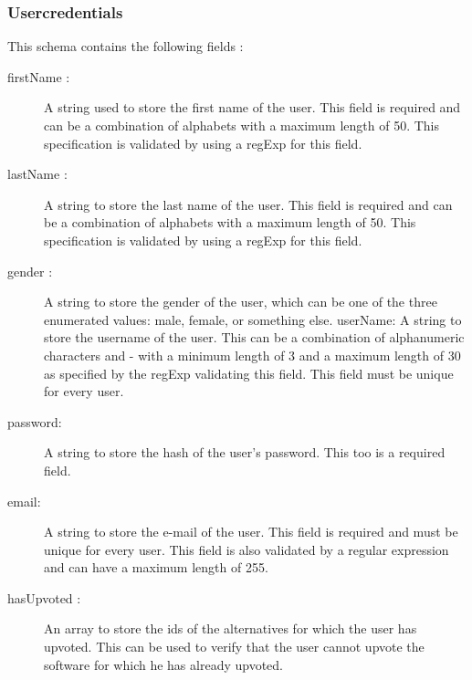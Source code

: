 \subsubsection{Usercredentials}

This schema contains the following fields :

\begin{description}

    \item[firstName : ]
          A string used to store the first name of the user. This field is required and can be a combination of alphabets with a maximum length of 50. This specification is validated by using a regExp for this field.

    \item[lastName : ]
          A string to store the last name of the user. This field is required and can be a combination of alphabets with a maximum length of 50. This specification is validated by using a regExp for this field.

    \item[gender : ]
          A string to store the gender of the user, which can be one of the three enumerated values: male, female, or something else.
          userName: A string to store the username of the user. This can be a combination of alphanumeric characters and - with a minimum length of 3 and a maximum length of 30 as specified by the regExp validating this field. This field must be unique for every user.

    \item[password:]
          A string to store the hash of the user’s password. This too is a required field.

    \item[email:]
          A string to store the e-mail of the user. This field is required and must be unique for every user. This field is also validated by a regular expression and can have a maximum length of 255.

    \item[hasUpvoted : ]
          An array to store the ids of the alternatives for which the user has upvoted. This can be used to verify that the user cannot upvote the software for which he has already upvoted.
\end{description}


































